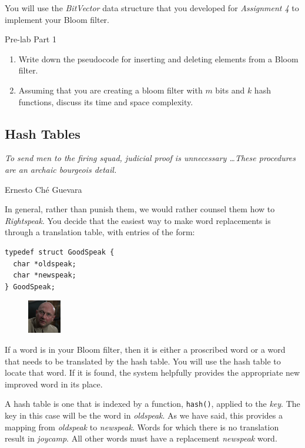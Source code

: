 \documentclass{article}
\begin{document}
You will use the \emph{BitVector} data structure that you developed
for \emph{Assignment 4} to implement your Bloom filter.

\medskip
\begin{prelab}{Pre-lab Part 1}
  \begin{enumerate}
    \item Write down the pseudocode for inserting and deleting elements from a
        Bloom filter.
    \item Assuming that you are creating a bloom filter with $m$ bits and $k$ hash
        functions, discuss its time and space complexity.
  \end{enumerate}
\end{prelab}

\subsection{Hash Tables}
\epigraph{\emph{To send men to the firing squad, judicial proof is unnecessary
\ldots These procedures are an archaic bourgeois detail.}}{Ernesto Ch\'e
Guevara}
\noindent
In general, rather than punish them, we would rather counsel them how to \emph{Rightspeak}. You
decide that the easiest way to make word replacements is through a translation
table, with entries of the form:

\lstset{language=C, style=c99}
\begin{lstlisting}[title=\texttt{GoodSpeak struct}]
typedef struct GoodSpeak {
  char *oldspeak;
  char *newspeak;
} GoodSpeak;
\end{lstlisting}

\begin{figure}
\centering
\includegraphics[width=0.130\textwidth]{Blofeld.png}
\end{figure}
If a word is in your Bloom filter, then it is either a proscribed word or a word that needs to be translated by the hash table. You will use the hash
table to locate that word. If it is found, the system
helpfully provides the appropriate new improved word in its place.

A hash table is one that is indexed by a function, \texttt{hash()}, applied to
the \emph{key}. The key in this case will be the word in \emph{oldspeak}.  As we
have said, this provides a mapping from \emph{oldspeak} to \emph{newspeak}.
Words for which there is no translation result in \emph{joycamp}.  All other
words must have a replacement \emph{newspeak} word.
\end{document}
